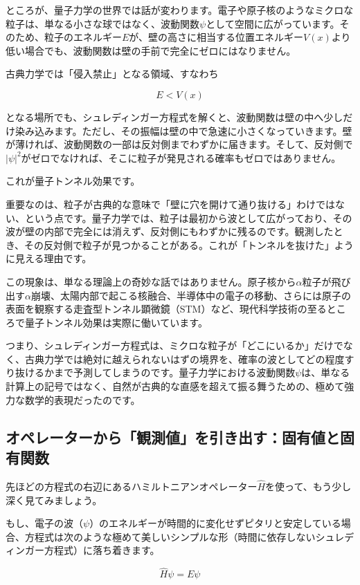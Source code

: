 ところが、量子力学の世界では話が変わります。電子や原子核のようなミクロな粒子は、単なる小さな球ではなく、波動関数\(\psi\)として空間に広がっています。そのため、粒子のエネルギー\(E\)が、壁の高さに相当する位置エネルギー\(V(x)\)より低い場合でも、波動関数は壁の手前で完全にゼロにはなりません。

古典力学では「侵入禁止」となる領域、すなわち

\[
E < V(x)
\]

となる場所でも、シュレディンガー方程式を解くと、波動関数は壁の中へ少しだけ染み込みます。ただし、その振幅は壁の中で急速に小さくなっていきます。壁が薄ければ、波動関数の一部は反対側までわずかに届きます。そして、反対側で\(|\psi|^2\)がゼロでなければ、そこに粒子が発見される確率もゼロではありません。

これが量子トンネル効果です。

重要なのは、粒子が古典的な意味で「壁に穴を開けて通り抜ける」わけではない、という点です。量子力学では、粒子は最初から波として広がっており、その波が壁の内部で完全には消えず、反対側にもわずかに残るのです。観測したとき、その反対側で粒子が見つかることがある。これが「トンネルを抜けた」ように見える理由です。

この現象は、単なる理論上の奇妙な話ではありません。原子核から\(\alpha\)粒子が飛び出す\(\alpha\)崩壊、太陽内部で起こる核融合、半導体中の電子の移動、さらには原子の表面を観察する走査型トンネル顕微鏡（STM）など、現代科学技術の至るところで量子トンネル効果は実際に働いています。

つまり、シュレディンガー方程式は、ミクロな粒子が「どこにいるか」だけでなく、古典力学では絶対に越えられないはずの境界を、確率の波としてどの程度すり抜けるかまで予測してしまうのです。量子力学における波動関数\(\psi\)は、単なる計算上の記号ではなく、自然が古典的な直感を超えて振る舞うための、極めて強力な数学的表現だったのです。

\subsection{オペレーターから「観測値」を引き出す：固有値と固有関数}

先ほどの方程式の右辺にあるハミルトニアンオペレーター\(\hat{H}\)を使って、もう少し深く見てみましょう。

もし、電子の波（\(\psi\)）のエネルギーが時間的に変化せずピタリと安定している場合、方程式は次のような極めて美しいシンプルな形（時間に依存しないシュレディンガー方程式）に落ち着きます。

\[\hat{H} \psi = E \psi\]

